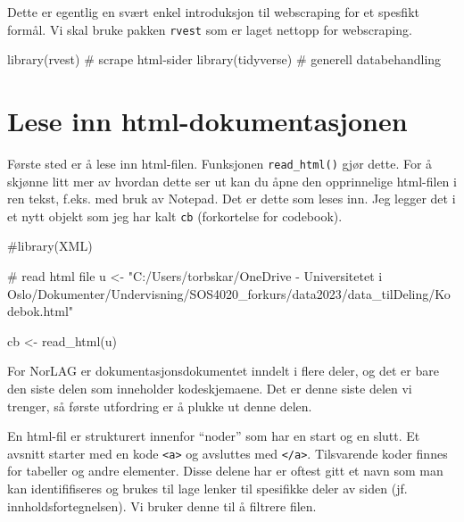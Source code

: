 \documentclass[
  letterpaper,
  DIV=11,
  numbers=noendperiod]{scrreprt}
\newenvironment{Shaded}{\begin{snugshade}}{\end{snugshade}}
\newcommand{\CommentTok}[1]{\textcolor[rgb]{0.37,0.37,0.37}{#1}}
\newcommand{\FunctionTok}[1]{\textcolor[rgb]{0.28,0.35,0.67}{#1}}
\newcommand{\NormalTok}[1]{\textcolor[rgb]{0.00,0.23,0.31}{#1}}
\newcommand{\OtherTok}[1]{\textcolor[rgb]{0.00,0.23,0.31}{#1}}
\newcommand{\StringTok}[1]{\textcolor[rgb]{0.13,0.47,0.30}{#1}}
\theoremstyle{definition}
\theoremstyle{remark}
\begin{document}
Dette er egentlig en svært enkel introduksjon til webscraping for et
spesfikt formål. Vi skal bruke pakken \texttt{rvest} som er laget
nettopp for webscraping.

\begin{Shaded}
\begin{Highlighting}[]
\FunctionTok{library}\NormalTok{(rvest)       }\CommentTok{\# scrape html{-}sider}
\FunctionTok{library}\NormalTok{(tidyverse)   }\CommentTok{\# generell databehandling}
\end{Highlighting}
\end{Shaded}

\hypertarget{lese-inn-html-dokumentasjonen}{%
\section{Lese inn
html-dokumentasjonen}\label{lese-inn-html-dokumentasjonen}}

Første sted er å lese inn html-filen. Funksjonen \texttt{read\_html()}
gjør dette. For å skjønne litt mer av hvordan dette ser ut kan du åpne
den opprinnelige html-filen i ren tekst, f.eks. med bruk av Notepad. Det
er dette som leses inn. Jeg legger det i et nytt objekt som jeg har kalt
\texttt{cb} (forkortelse for codebook).

\begin{Shaded}
\begin{Highlighting}[]
\CommentTok{\#library(XML)}

\CommentTok{\# read html file}
\NormalTok{u }\OtherTok{\textless{}{-}} \StringTok{"C:/Users/torbskar/OneDrive {-} Universitetet i Oslo/Dokumenter/Undervisning/SOS4020\_forkurs/data2023/data\_tilDeling/Kodebok.html"}

\NormalTok{cb }\OtherTok{\textless{}{-}} \FunctionTok{read\_html}\NormalTok{(u)}
\end{Highlighting}
\end{Shaded}

For NorLAG er dokumentasjonsdokumentet inndelt i flere deler, og det er
bare den siste delen som inneholder kodeskjemaene. Det er denne siste
delen vi trenger, så første utfordring er å plukke ut denne delen.

En html-fil er strukturert innenfor ``noder'' som har en start og en
slutt. Et avsnitt starter med en kode
\texttt{\textless{}a\textgreater{}} og avsluttes med
\texttt{\textless{}/a\textgreater{}}. Tilsvarende koder finnes for
tabeller og andre elementer. Disse delene har er oftest gitt et navn som
man kan identififiseres og brukes til lage lenker til spesifikke deler
av siden (jf. innholdsfortegnelsen). Vi bruker denne til å filtrere
filen.
\end{document}
